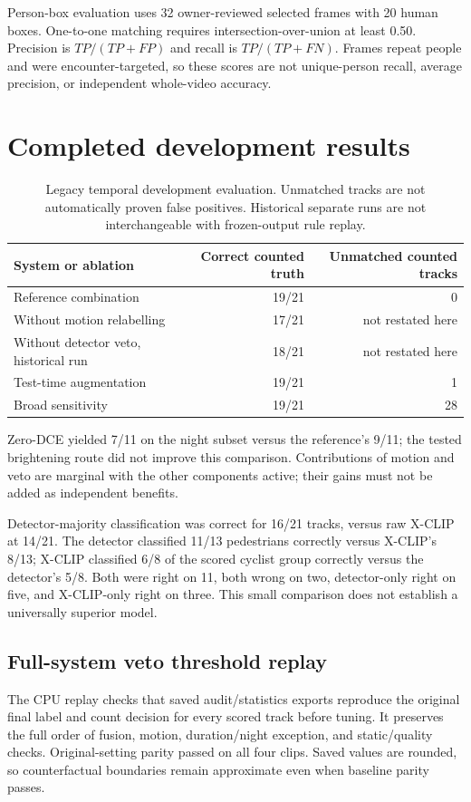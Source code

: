 \documentclass[11pt,letterpaper]{article}
\begin{document}
Person-box evaluation uses 32 owner-reviewed selected frames with 20 human boxes. One-to-one matching requires intersection-over-union at least 0.50. Precision is $TP/(TP+FP)$ and recall is $TP/(TP+FN)$. Frames repeat people and were encounter-targeted, so these scores are not unique-person recall, average precision, or independent whole-video accuracy.

\section{Completed development results}
\begin{table}[ht]
\centering
\begin{tabular}{lrr}
\toprule
System or ablation & Correct counted truth & Unmatched counted tracks\\
\midrule
Reference combination &19/21&0\\
Without motion relabelling &17/21&not restated here\\
Without detector veto, historical run &18/21&not restated here\\
Test-time augmentation &19/21&1\\
Broad sensitivity &19/21&28\\
\bottomrule
\end{tabular}
\caption{Legacy temporal development evaluation. Unmatched tracks are not automatically proven false positives. Historical separate runs are not interchangeable with frozen-output rule replay.}
\end{table}
Zero-DCE yielded 7/11 on the night subset versus the reference's 9/11; the tested brightening route did not improve this comparison. Contributions of motion and veto are marginal with the other components active; their gains must not be added as independent benefits.

Detector-majority classification was correct for 16/21 tracks, versus raw X-CLIP at 14/21. The detector classified 11/13 pedestrians correctly versus X-CLIP's 8/13; X-CLIP classified 6/8 of the scored cyclist group correctly versus the detector's 5/8. Both were right on 11, both wrong on two, detector-only right on five, and X-CLIP-only right on three. This small comparison does not establish a universally superior model.

\subsection{Full-system veto threshold replay}
The CPU replay checks that saved audit/statistics exports reproduce the original final label and count decision for every scored track before tuning. It preserves the full order of fusion, motion, duration/night exception, and static/quality checks. Original-setting parity passed on all four clips. Saved values are rounded, so counterfactual boundaries remain approximate even when baseline parity passes.
\end{document}
